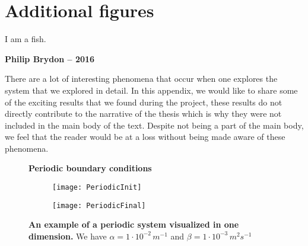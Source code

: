 \chapter{Additional figures}
\renewcommand{\textflush}{flushright} \renewcommand{\sourceflush}{flushright}
\setlength{}
\epigraph{I am a fish.}{\textbf{Philip Brydon -- 2016}}

There are a lot of interesting phenomena that occur when one explores the system that we explored in detail. In this appendix, we would like to share some of the exciting results that we found during the project, these results do not directly contribute to the narrative of the thesis which is why they were not included in the main body of the text. Despite not being a part of the main body, we feel that the reader would be at a loss without being made aware of these phenomena.

\begin{figure}
	\center
	\textbf{Periodic boundary conditions}
	\vspace{0.5cm}

	\begin{subfigure}{0.49\textwidth}
		\texttt{[image: PeriodicInit]}
	\end{subfigure}
	\begin{subfigure}{0.49\textwidth}
		\texttt{[image: PeriodicFinal]}
	\end{subfigure}
	\caption{\textbf{An example of a periodic system visualized in one dimension.} We have $\alpha = 1 \cdot 10^{-2} \, m^{-1}$ and $\beta = 1 \cdot 10^{-3}  \, m^2 s^{-1}$}
\end{figure}